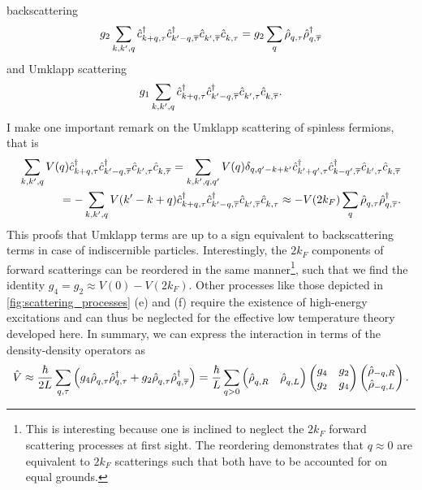 backscattering
\begin{align}
    g_2\sum_{k,k',q}\hat c^\dag_{k+q,\tau}\hat c^\dag_{k'-q,\overline\tau}\hat c^\pdag_{k',\overline\tau}\hat c^\pdag_{k,\tau} = g_2\sum_q \hat\rho^\pdag_{q,\tau}\hat\rho^\dag_{q,\overline\tau}
\end{align}
and Umklapp scattering
\begin{align}
    g_1\sum_{k,k',q} \hat c^\dag_{k+q,\tau}\hat c^\dag_{k'-q,\overline\tau}\hat c^\pdag_{k',\tau}\hat c^\pdag_{k,\overline\tau}.
\end{align}
I make one important remark on the Umklapp scattering of spinless fermions, that is
\begin{align}
    \sum_{k,k',q}V(q)
    \hat c^\dag_{k+q,\tau}\hat c^\dag_{k'-q,\overline\tau}\hat c^\pdag_{k',\tau}\hat c^\pdag_{k,\overline\tau}
    =
    \sum_{k,k',q,q'}V(q) \delta_{q,q'-k+k'}
    \hat c^\dag_{k'+q',\tau}\hat c^\dag_{k-q',\overline\tau}\hat c^\pdag_{k',\tau}\hat c^\pdag_{k,\overline\tau}
    \\
    =
    -\sum_{k,k',q}V(k'-k+q)\hat c^\dag_{k+q,\tau}\hat c^\dag_{k'-q,\overline\tau}\hat c^\pdag_{k',\overline\tau}\hat c^\pdag_{k,\tau}
    \approx -V(2k_F)\sum_q\hat\rho^\pdag_{q,\tau}\hat\rho^\dag_{q,\overline\tau}.
\end{align}
This proofs that Umklapp terms are up to a sign equivalent to backscattering terms in case of indiscernible particles.
Interestingly, the $2k_F$ components of forward scatterings can be reordered in the same manner\footnote{This is interesting because one is inclined to neglect the $2k_F$ forward scattering processes at first sight. The reordering demonstrates that $q\approx0$ are equivalent to $2k_F$ scatterings such that both have to be accounted for on equal grounds.}, such that we find the identity $g_4 = g_2 \approx V(0)-V(2k_F)$.
Other processes like those depicted in \cref{fig:scattering_processes} (e) and (f) require the existence of high-energy excitations and can thus be neglected for the effective low temperature theory developed here.
In summary, we can express the interaction in terms of the density-density operators as
\begin{align}
    \hat V \approx \frac{\hbar}{2L}\sum_{q,\tau}\brlr{g_4\hat\rho^\pdag_{q,\tau}\hat\rho^\dag_{q,\tau} + g_2\hat\rho^\pdag_{q,\tau}\hat\rho^\dag_{q,\overline\tau}}
    =
    \frac{\hbar}{L}\sum_{q>0}
    \begin{pmatrix}
        \hat\rho^\pdag_{q,R} & \hat\rho^\pdag_{q,L}
    \end{pmatrix}
    \begin{pmatrix}
        g_4 & g_2 \\
        g_2 & g_4
    \end{pmatrix}
    \begin{pmatrix}
        \hat\rho_{-q,R} \\ \hat\rho_{-q,L}
    \end{pmatrix}
    .
    \label{eq:interaction_densities}
\end{align}

